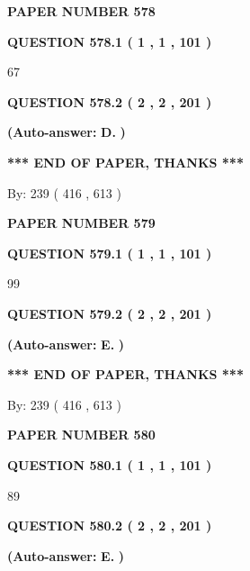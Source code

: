 \documentclass{ctexart}
\begin{document}
   
 {\textbf{ \Large{ PAPER NUMBER  578  }}}
   
   
   
   
  
  
{\textbf{\large{QUESTION
578.1 
 ( 1 , 1 , 101 )
}}}

67
  
  
{\textbf{\large{QUESTION
578.2 
 ( 2 , 2 , 201 )
}}}
 
 
{\textbf{(Auto-answer:}}
{\textbf{\large{
D.}}}
{\textbf{)}}
 
 
   
   
   
   
\vspace{1.0in} 
{\textbf{\large{ *** END OF PAPER, THANKS *** }}} 
   
   
\hspace{1.0in} By: 
 239 ( 416 ,  613 )
   
   
   
   
\newpage 
\setcounter{page}{ 
   579001 } 
   
   
 {\textbf{ \Large{ PAPER NUMBER  579  }}}
   
   
   
   
  
  
{\textbf{\large{QUESTION
579.1 
 ( 1 , 1 , 101 )
}}}

99
  
  
{\textbf{\large{QUESTION
579.2 
 ( 2 , 2 , 201 )
}}}
 
 
{\textbf{(Auto-answer:}}
{\textbf{\large{
E.}}}
{\textbf{)}}
 
 
   
   
   
   
\vspace{1.0in} 
{\textbf{\large{ *** END OF PAPER, THANKS *** }}} 
   
   
\hspace{1.0in} By: 
 239 ( 416 ,  613 )
   
   
   
   
\newpage 
\setcounter{page}{ 
   580001 } 
   
   
 {\textbf{ \Large{ PAPER NUMBER  580  }}}
   
   
   
   
  
  
{\textbf{\large{QUESTION
580.1 
 ( 1 , 1 , 101 )
}}}

89
  
  
{\textbf{\large{QUESTION
580.2 
 ( 2 , 2 , 201 )
}}}
 
 
{\textbf{(Auto-answer:}}
{\textbf{\large{
E.}}}
{\textbf{)}}
 
\end{document}

